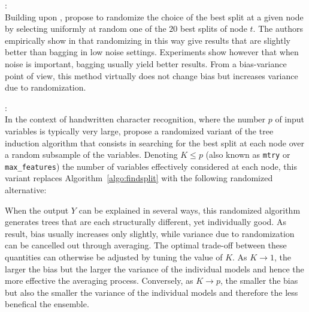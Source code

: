 \begin{description}
\item \citet{dietterich:1995}: \hfill \\
    Building upon \citep{kwok:1990}, \citet{dietterich:1995} propose
    to randomize the choice of the best split at a given node by selecting
    uniformly at random one of the $20$ best splits of node $t$. The authors empirically
    show in \citep{dietterich:1995,dietterich:2000} that randomizing in this
    way give results that are slightly better than bagging in low noise settings.
    Experiments show however that when noise is important, bagging usually
    yield better results. From a bias-variance point of view, this method
    virtually does not change bias but increases variance due to randomization.

\item \citet{amit:1997}: \hfill \\
    In the context of handwritten character recognition, where the number $p$
    of input variables is typically very large, \citet{amit:1997} propose a
    randomized variant of the tree induction algorithm that consists in
    searching for the best split at each node over a random subsample of the
    variables. Denoting $K \leq p$ (also known as \texttt{mtry} or
    \texttt{max\_features}) the number of variables effectively considered at
    each node, this variant replaces Algorithm~\ref{algo:findsplit}
    with the following randomized alternative:
    When the output $Y$ can be explained in several ways, this randomized
    algorithm generates trees that are each structurally different, yet
    individually good. As result, bias usually increases only slightly, while
    variance due to randomization can be cancelled out through averaging. The
    optimal trade-off between these quantities can otherwise be adjusted by
    tuning the value of $K$. As $K \to 1$, the larger the bias but the larger the
    variance of the individual models and hence the more effective the
    averaging process. Conversely, as $K \to p$, the smaller the bias but also the
    smaller the variance of the individual models and therefore the less
    benefical the ensemble.


\end{description}
